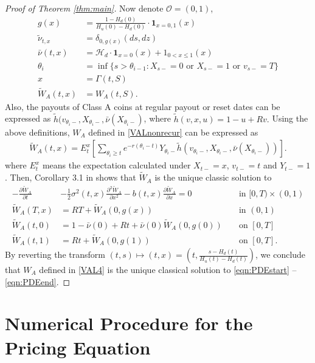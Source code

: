 \documentclass[11pt]{article}%
\numberwithin{equation}{section}
\theoremstyle{plain}
\newcommand{\der}[2]{\ensuremath{\frac{\partial #1}{\partial #2}}}
\newcommand{\dder}[2]{\ensuremath{\frac{\partial^2 #1}{\partial #2^2}}}
\begin{document}
\begin{appendices}
\begin{proof}[Proof of Theorem \ref{thm:main}]
	Now denote $\mathcal{O}=(0,1)$,
	\begin{align*}
		g(x)&=\frac{1-H_d(0)}{H_u(0)-H_d(0)}\cdot\mathbf{1}_{x=0,1}(x)\\
		\tilde{\nu}_{t,x}&=\delta_{0,g(x)}(ds,dz)\\
		\bar{\nu}(t,x)&=\mathcal{H}_d\cdot \mathbf{1}_{x=0}(x)+1_{0<x\le 1}(x)\\
		\theta_i&=\inf\{s>\theta_{i-1}:X_{s-}=0\text{ or }X_{s-}=1\text{ or }v_{s-}=T\}\\
		x&=\Gamma(t,S)\\
		\tilde{W}_A(t,x)&=W_A(t,S).
	\end{align*}
	Also, the payouts of Class A coins at regular payout or reset dates can be expressed as $\tilde{h}(v_{\theta_i-},X_{\theta_i-},\bar{\nu}(X_{\theta_i-})$, where
	$\tilde{h}(v,x,u)=1-u+Rv.$
	Using the above definitions, $W_A$ defined in \eqref{VALnonrecur} can be expressed as
	\begin{align*}
		\tilde{W}_A(t,x)=E_t^x\left[\sum_{\theta_i\ge t}e^{-r(\theta_i-t)}Y_{\theta_i-}\tilde{h}(v_{\theta_i-},X_{\theta_i-},\bar{\nu}(X_{\theta_i-}))\right].
	\end{align*}
	where $E_t^x$ means the expectation calculated under $X_{t-}=x$, $v_{t-}=t$ and $Y_{t-}=1$. Then, Corollary 3.1 in \cite{dai_stochastic_2017} shows that $\tilde{W}_A$ is the unique classic solution to
	\begin{align}\label{eqn:transformedPDEstart}
		-\der{\tilde{W}_A}{t}&-\frac{1}{2}\sigma^2(t,x)\dder{\tilde{W}_A}{x}-b(t,x)\der{\tilde{W}_A}{x}=0 && \text{ in }[0,T)\times(0,1)\\
		\tilde{W}_A(T,x)&=RT+\tilde{W}_A(0,g(x)) && \text{ in }(0,1)\\
		\tilde{W}_A(t,0)&=1-\bar{\nu}(0)+Rt+\bar{\nu}(0)\tilde{W}_A(0,g(0)) && \text{ on }[0,T]\\ \label{eqn:transformedPDEend}
		\tilde{W}_A(t,1)&=Rt+\tilde{W}_A(0,g(1)) && \text{ on }[0,T].
	\end{align}
	By reverting the transform $(t,s)\mapsto(t,x)=\left(t,\frac{s-H_d(t)}{H_u(t)-H_d(t)}\right)$, we conclude that $W_A$ defined in \eqref{VAL4} is the unique classical solution to \eqref{eqn:PDEstart} -- \eqref{eqn:PDEend}.
\end{proof}

\section{Numerical Procedure for the Pricing Equation}\label{subsec:Numerical-Procedure-for}


\end{appendices}
\end{document}
